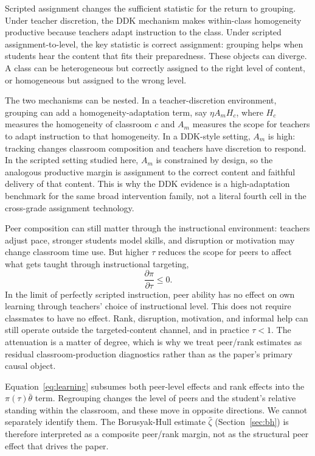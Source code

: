 \documentclass[11pt]{article}
\begin{document}
Scripted assignment changes the sufficient statistic for the return to grouping. Under teacher discretion, the DDK mechanism makes within-class homogeneity productive because teachers adapt instruction to the class. Under scripted assignment-to-level, the key statistic is correct assignment: grouping helps when students hear the content that fits their preparedness. These objects can diverge. A class can be heterogeneous but correctly assigned to the right level of content, or homogeneous but assigned to the wrong level.

The two mechanisms can be nested. In a teacher-discretion environment, grouping can add a homogeneity-adaptation term, say $\eta A_m H_c$, where $H_c$ measures the homogeneity of classroom $c$ and $A_m$ measures the scope for teachers to adapt instruction to that homogeneity. In a DDK-style setting, $A_m$ is high: tracking changes classroom composition and teachers have discretion to respond. In the scripted setting studied here, $A_m$ is constrained by design, so the analogous productive margin is assignment to the correct content and faithful delivery of that content. This is why the DDK evidence is a high-adaptation benchmark for the same broad intervention family, not a literal fourth cell in the cross-grade assignment technology.

Peer composition can still matter through the instructional environment: teachers adjust pace, stronger students model skills, and disruption or motivation may change classroom time use. But higher $\tau$ reduces the scope for peers to affect what gets taught through instructional targeting,
\begin{equation}
\label{eq:pi_tau}
\frac{\partial \pi}{\partial \tau} \leq 0.
\end{equation}
In the limit of perfectly scripted instruction, peer ability has no effect on own learning through teachers' choice of instructional level. This does not require classmates to have no effect. Rank, disruption, motivation, and informal help can still operate outside the targeted-content channel, and in practice $\tau<1$. The attenuation is a matter of degree, which is why we treat peer/rank estimates as residual classroom-production diagnostics rather than as the paper's primary causal object.

Equation~\eqref{eq:learning} subsumes both peer-level effects and rank effects into the $\pi(\tau)\bar{\theta}$ term. Regrouping changes the level of peers and the student's relative standing within the classroom, and these move in opposite directions. We cannot separately identify them. The Borusyak-Hull estimate $\hat{\zeta}$ (Section~\ref{sec:bh}) is therefore interpreted as a composite peer/rank margin, not as the structural peer effect that drives the paper.
\end{document}
